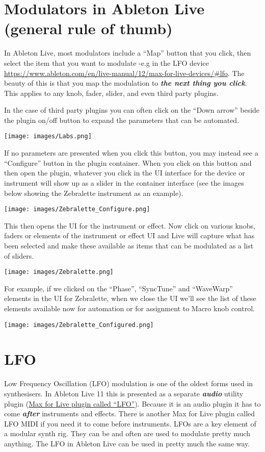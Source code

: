 \documentclass[
  12pt,
  letterpaper,
  oneside,
  open=any]{scrbook}
\begin{document}
\section{Modulators in Ableton Live (general rule of
thumb)}\label{modulators-in-ableton-live-general-rule-of-thumb}

In Ableton Live, most modulators include a ``Map'' button that you
click, then select the item that you want to modulate -e.g in the LFO
device
\url{https://www.ableton.com/en/live-manual/12/max-for-live-devices/\#lfo}.
The beauty of this is that you map the modulation to \textbf{\emph{the
next thing you click}}. This applies to any knob, fader, slider, and
even third party plugins.

In the case of third party plugins you can often click on the ``Down
arrow'' beside the plugin on/off button to expand the parameters that
can be automated.

\texttt{[image: images/Labs.png]}

If no parameters are presented when you click this button, you may
instead see a ``Configure'' button in the plugin container. When you
click on this button and then open the plugin, whatever you click in the
UI interface for the device or instrument will show up as a slider in
the container interface (see the images below showing the Zebralette
instrument as an example).

\texttt{[image: images/Zebralette\_Configure.png]}

This then opens the UI for the instrument or effect. Now click on
various knobs, faders or elements of the instrument or effect UI and
Live will capture what has been selected and make these available as
items that can be modulated as a list of sliders.

\texttt{[image: images/Zebralette.png]}

For example, if we clicked on the ``Phase'', ``SyncTune'' and
``WaveWarp'' elements in the UI for Zebralette, when we close the UI
we'll see the list of these elements available now for automation or for
assignment to Macro knob control.

\texttt{[image: images/Zebralette\_Configured.png]}

\section{LFO}\label{lfo}

Low Frequency Oscillation (LFO) modulation is one of the oldest forms
used in synthesisers. In Ableton Live 11 this is presented as a separate
\textbf{\emph{audio}} utility plugin
(\href{https://www.ableton.com/en/live-manual/11/max-for-live-devices/\#lfo}{Max
for Live plugin called ``LFO''}). Because it is an audio plugin it has
to come \textbf{\emph{after}} instruments and effects. There is another
Max for Live plugin called LFO MIDI if you need it to come before
instruments. LFOs are a key element of a modular synth rig. They can be
and often are used to modulate pretty much anything. The LFO in Ableton
Live can be used in pretty much the same way.
\end{document}
